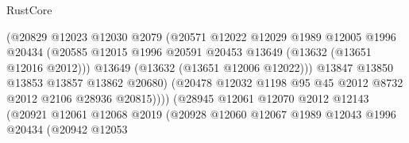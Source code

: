 \begin{lexlean}{RustCore}
\begin{coremodule}
                                      (@20829
                                        @12023
                                        @12030
                                        @2079
                                        (@20571
                                          @12022
                                          @12029
                                          @1989
                                          @12005
                                          @1996
                                          @20434
                                          (@20585
                                            @12015
                                            @1996
                                            @20591
                                            @20453
                                            @13649
                                            (@13632 (@13651 @12016 @2012)))
                                          @13649
                                          (@13632 (@13651 @12006 @12022)))
                                        @13847
                                        @13850
                                        @13853
                                        @13857
                                        @13862
                                        @20680)
                                      (@20478
                                        @12032
                                        @1198
                                        @95
                                        @45
                                        @2012
                                        @8732
                                        @2012
                                        @2106
                                        @28936
                                        @20815))))
                                (@28945
                                  @12061
                                  @12070
                                  @2012
                                  @12143
                                  (@20921
                                    @12061
                                    @12068
                                    @2019
                                    (@20928
                                      @12060
                                      @12067
                                      @1989
                                      @12043
                                      @1996
                                      @20434
                                      (@20942
                                        @12053

\end{coremodule}
\end{lexlean}
